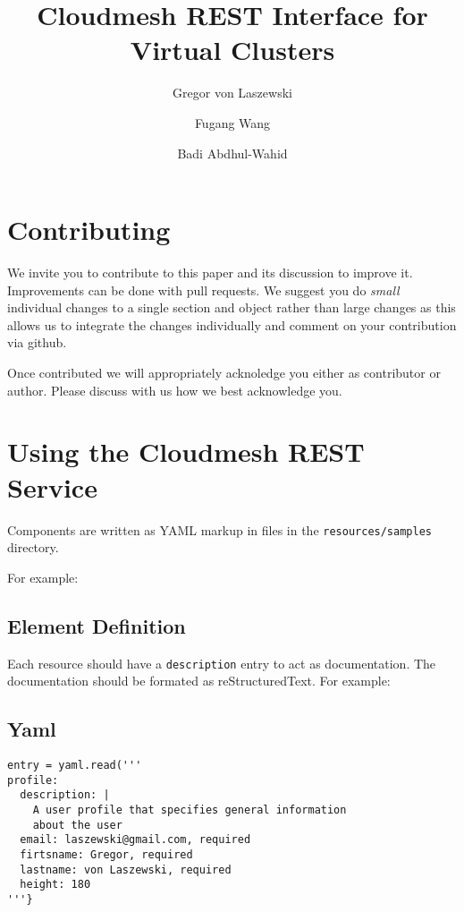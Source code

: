 \documentclass[9pt,twocolumn,twoside]{styles/osajnl}
\title{Cloudmesh REST Interface for Virtual Clusters}
\author[1,*]{Gregor von Laszewski}
\author[1]{Fugang Wang}
\author[1]{Badi Abdhul-Wahid}
\affil[1]{School of Informatics and Computing, Bloomington, IN 47408, U.S.A.}
\affil[*]{Corresponding authors: laszewski@gmal.com}
\begin{document}
\flushbottom %

\maketitle %

\tableofcontents %
\maketitle



\section{Contributing}

We invite you to contribute to this paper and its discussion to
improve it. Improvements can be done with pull requests. We suggest
you do {\em small} individual changes to a single section and object
rather than large changes as this allows us to integrate the changes
individually and comment on your contribution via github.

Once contributed we will appropriately acknoledge you either as
contributor or author. Please discuss with us how we best acknowledge
you.

\section{Using the Cloudmesh REST Service} 

Components are written as YAML markup in files in the
\verb+resources/samples+ directory.

For example:


\subsection{Element Definition}

Each resource should have a \verb+description+ entry to act as
documentation. The documentation should be formated as
reStructuredText. For example:

\subsection{Yaml}

\begin{Verbatim}
entry = yaml.read('''
profile:
  description: |
    A user profile that specifies general information 
    about the user
  email: laszewski@gmail.com, required
  firtsname: Gregor, required
  lastname: von Laszewski, required
  height: 180
'''}
\end{Verbatim}
\end{document}
